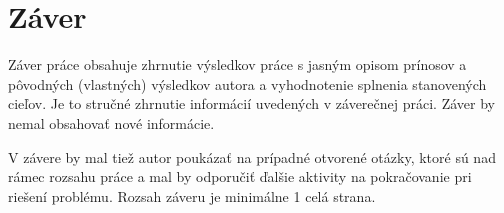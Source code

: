 
\chapter{Záver}\label{ch:summary}

Záver práce obsahuje zhrnutie výsledkov práce s jasným opisom prínosov a pôvodných (vlastných) výsledkov autora a vyhodnotenie splnenia stanovených cieľov. Je to stručné zhrnutie informácií uvedených v záverečnej práci. Záver by nemal obsahovať nové informácie.

V závere by mal tiež autor poukázať na prípadné otvorené otázky, ktoré sú nad rámec rozsahu práce a mal by odporučiť ďalšie aktivity na pokračovanie pri riešení problému. Rozsah záveru je minimálne 1 celá strana.
